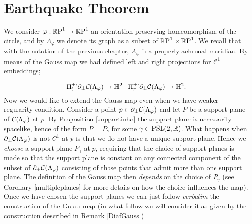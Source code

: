 

\section{Earthquake Theorem}\label{quakesection}
We consider $\varphi:\S\to\S$ an orientation-preserving homeomorphism of the circle, and by $\Lambda_\varphi$ we denote its graph as a subset of $\T$. We recall that with the notation of the previous chapter, $\Lambda_\varphi$ is a properly achronal meridian. By means of the Gauss map we had defined left and right projections for $\mathcal{C}^1$ embeddings; 

\[
    \Pi_l^{\pm:}\partial_\pm\CF\to\H^2 \;\;\; \Pi_r^{\pm:}\partial_\pm\CF\to\H^2.
\]
Now we would like to extend the Gauss map even when we have weaker regularity condition. Consider a point $p \in \partial_\pm\CF$ and let $P$ be a support plane of $\CF$ at $p$. By Proposition \ref{supportinho} the support plane is necessarily spacelike, hence of the form $P=P_\gamma$ for some $\gamma\in\PSL$. What happens when $\partial_\pm\CF$ is not $C^1$ at $p$ is that we do not have a unique support plane. Hence we \textit{choose} a support plane $P_\gamma$ at $p$, requiring that the choice of support planes is made so that the support plane is constant on any connected component of the subset of $\partial_\pm\CF$ consisting of those points that admit more than one support plane. The definition of the Gauss map then \textit{depends} on the choice of $P_\gamma$ (see Corollary \ref{multipleplanes} for more details on how the choice influences the map). Once we have chosen the support planes we can just follow \textit{verbatim} the construction of the Gauss map (in what follow we will consider it as given by the construction described in Remark \ref{DiafGauss})

